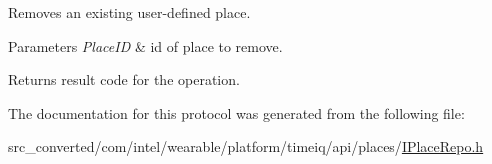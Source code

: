 Removes an existing user-\/defined place. 


\begin{DoxyParams}{Parameters}
{\em Place\+I\+D} & id of place to remove. \\
\hline
\end{DoxyParams}
\begin{DoxyReturn}{Returns}
result code for the operation. 
\end{DoxyReturn}


The documentation for this protocol was generated from the following file\+:\begin{DoxyCompactItemize}
\item 
src\+\_\+converted/com/intel/wearable/platform/timeiq/api/places/\hyperlink{_i_place_repo_8h}{I\+Place\+Repo.\+h}\end{DoxyCompactItemize}
